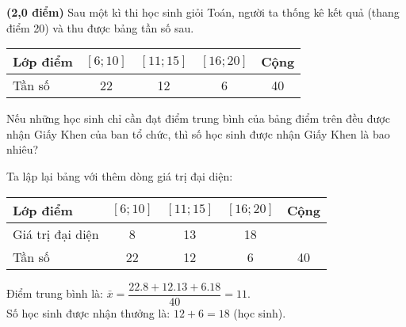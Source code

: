 \begin{bt}%
	\textbf{(2,0 điểm)}
	Sau một kì thi học sinh giỏi Toán, người ta thống kê kết quả (thang điểm 20) và thu được bảng tần số sau.
	\begin{center}
		\begin{tabular}{|l|c|c|c|c|}
			\hline
			{Lớp điểm}&{$[6;10]$}&{$[11;15]$}&{$[16;20]$}&{Cộng}\\
			\hline
			{Tần số}&{22}&{12}&{6}&{40}\\
			\hline
		\end{tabular}
	\end{center}
	Nếu những học sinh chỉ cần đạt điểm trung bình của bảng điểm trên đều được nhận Giấy Khen của ban tổ chức, thì số học sinh được nhận Giấy Khen là bao nhiêu?
	\loigiai
	{Ta lập lại bảng với thêm dòng giá trị đại diện:
		\begin{center}
			\begin{tabular}{|l|c|c|c|c|}
				\hline
				{Lớp điểm}&{$[6;10]$}&{$[11;15]$}&{$[16;20]$}&{Cộng}\\
				\hline
				{Giá trị đại diện}&{8}&{13}&{18}&{}\\
				\hline
				{Tần số}&{22}&{12}&{6}&{40}\\
				\hline
			\end{tabular}
		\end{center}
		Điểm trung bình là: $\bar{x}=\dfrac{22.8+12.13+6.18}{40}=11$.\\
		Số học sinh được nhận thưởng là: $12+6=18$ (học sinh).
	}
\end{bt}